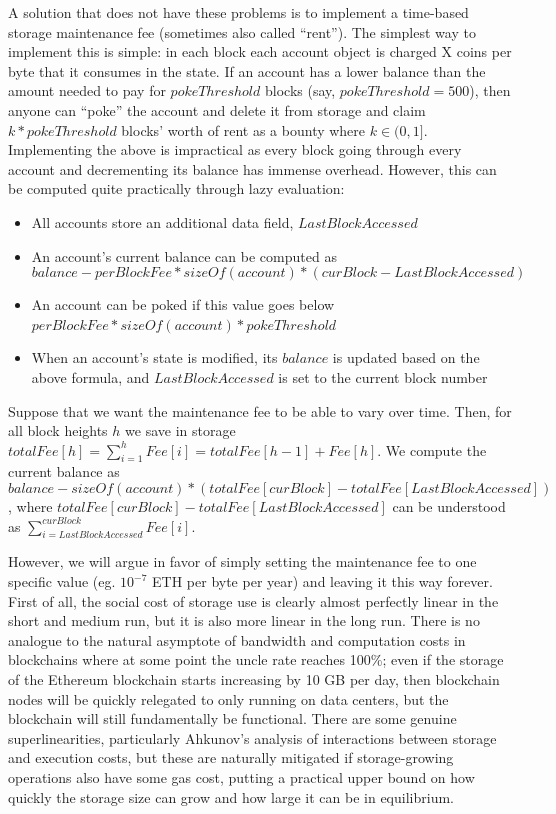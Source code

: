 \documentclass[12pt, final]{article}
\begin{document}
A solution that does not have these problems is to implement a time-based storage maintenance fee (sometimes also called ``rent''). The simplest way to implement this is simple: in each block each account object is charged X coins per byte that it consumes in the state. If an account has a lower balance than the amount needed to pay for $pokeThreshold$ blocks (say, $pokeThreshold = 500$), then anyone can ``poke'' the account and delete it from storage and claim $k * pokeThreshold$ blocks' worth of rent as a bounty where $k \in (0,1]$. Implementing the above is impractical as every block going through every account and decrementing its balance has immense overhead. However, this can be computed quite practically through lazy evaluation:

\begin{itemize}
\item All accounts store an additional data field, $LastBlockAccessed$
\item An account's current balance can be computed as $$balance - perBlockFee * sizeOf(account) * (curBlock - LastBlockAccessed)$$
\item An account can be poked if this value goes below $perBlockFee * sizeOf(account) * pokeThreshold$
\item When an account's state is modified, its $balance$ is updated based on the above formula, and $LastBlockAccessed$ is set to the current block number
\end{itemize}

Suppose that we want the maintenance fee to be able to vary over time. Then, for all block heights $h$ we save in storage $totalFee[h] = \sum_{i=1}^h Fee[i] = totalFee[h-1] + Fee[h]$. We compute the current balance as $$balance - sizeOf(account) * (totalFee[curBlock] - totalFee[LastBlockAccessed])$$, where $totalFee[curBlock] - totalFee[LastBlockAccessed]$ can be understood as $\sum_{i=LastBlockAccessed}^{curBlock} Fee[i]$.

However, we will argue in favor of simply setting the maintenance fee to one specific value (eg. $10^{-7}$ ETH per byte per year) and leaving it this way forever. First of all, the social cost of storage use is clearly almost perfectly linear in the short and medium run, but it is also more linear in the long run. There is no analogue to the natural asymptote of bandwidth and computation costs in blockchains where at some point the uncle rate reaches 100\%; even if the storage of the Ethereum blockchain starts increasing by 10 GB per day, then blockchain nodes will be quickly relegated to only running on data centers, but the blockchain will still fundamentally be functional. There are some genuine superlinearities, particularly Ahkunov's analysis of interactions between storage and execution costs, but these are naturally mitigated if storage-growing operations also have some gas cost, putting a practical upper bound on how quickly the storage size can grow and how large it can be in equilibrium.
\end{document}
